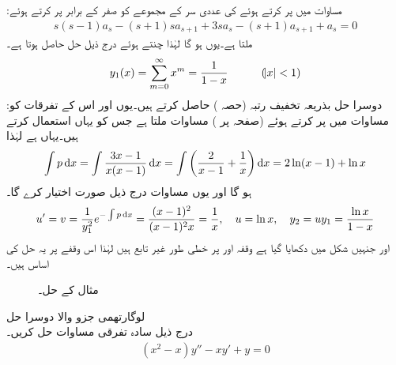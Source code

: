 :مساوات  میں  پر کرتے  ہوئے  کی عددی سر کے مجموعے کو صفر کے برابر پر کرتے ہوئے
\begin{align*}
s(s-1)a_s-(s+1)sa_{s+1}+3sa_s-(s+1)a_{s+1}+a_s=0
\end{align*}
 ملتا ہے۔یوں  ہو گا لہٰذا  چنتے ہوئے درج ذیل حل حاصل ہوتا ہے۔
\begin{align*}
y_1(x)=\sum_{m=0}^{\infty} x^m=\frac{1}{1-x}\quad \quad \quad (\abs{x} <1)
\end{align*}
:دوسرا حل بذریعہ تخفیف رتبہ (حصہ ) حاصل کرتے ہیں۔یوں  اور اس کے تفرقات کو مساوات میں پر کرتے ہوئے (صفحہ  پر ) مساوات  ملتا ہے جس  کو یہاں استعمال کرتے ہیں۔یہاں  ہے لہٰذا
\begin{align*}
\int p\dif x=\int \frac{3x-1}{x(x-1)}\dif x=\int \left(\frac{2}{x-1}+\frac{1}{x}\right)\dif x=2\ln(x-1)+\ln x
\end{align*}
ہو گا اور یوں مساوات  درج ذیل صورت اختیار کرے گا۔
 \begin{align*}
u'=v=\frac{1}{y_1^2}e^{-\int p \dif x}=\frac{(x-1)^2}{(x-1)^2x}=\frac{1}{x}, \quad u=\ln x, \quad y_2=uy_1=\frac{\ln x}{1-x}
\end{align*}
 اور  جنہیں شکل میں دکھایا گیا ہے وقفہ  اور  پر خطی طور غیر تابع ہیں لہٰذا اس وقفے پر یہ حل کی اساس ہیں۔
\begin{figure}
\centering
{}
\caption{مثال  کے حل۔}
\label{شکل_مثال_بیسل_دوسری_صورت_دوہرا_حل}
\end{figure} 
\quad لوگارتھمی جزو والا دوسرا حل\\
درج ذیل سادہ تفرقی مساوات حل کریں۔
\begin{align}\label{مساوات_بیسل_لوگارتھمی_جزو_الف}
(x^2-x)y''-xy'+y=0
\end{align}


